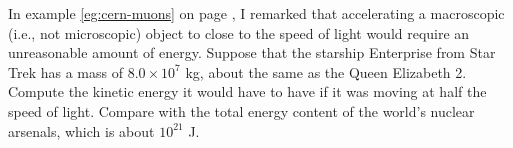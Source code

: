 In example \ref{eg:cern-muons} on page \pageref{eg:cern-muons}, I remarked that accelerating a macroscopic
(i.e., not microscopic) object to close to the speed of light would require an unreasonable amount of energy.
Suppose that the starship Enterprise from Star Trek has a mass
of $8.0\times10^7$ kg, about the same as the Queen Elizabeth 2.
Compute the kinetic energy it would have to have if it
was moving at half the speed of light. Compare with the total
energy content of the world's nuclear arsenals, which is about $10^{21}$ J.\answercheck
